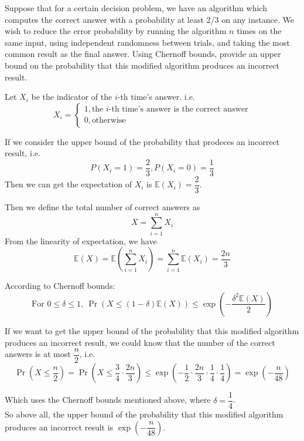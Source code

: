\problem{}
Suppose that for a certain decision problem, we have an algorithm which computes the correct answer with a probability  at least 2/3 on any instance.  We wish to reduce the error probability by running the algorithm $n$ times on the same input, using independent randomness between trials, and taking the most common result as the final answer. Using Chernoff bounds, provide an upper bound on the probability that this modified algorithm produces an incorrect result.

\solution{}

Let $X_i$ be the indicator of the $i$-th time's answer. i.e.
$$X_{i}=\begin{cases}1,\text{the $i$-th time's answer is the correct answer}\\0,\text{otherwise}\end{cases}$$

If we consider the upper bound of the probability that prodeces an incorrect result, i.e.
$$P(X_i=1)=\dfrac{2}{3}, P(X_i=0)=\dfrac{1}{3}$$
Then we can get the expectation of $X_i$ is $\mathbb{E}(X_i)=\dfrac{2}{3}$.

Then we define the total number of correct answers as $$X=\sum_{i=1}^nX_i$$
From the linearity of expectation, we have
$$\mathbb{E}(X)=\mathbb{E}\left(\sum_{i=1}^n{X_i}\right)=\sum_{i=1}^n\mathbb{E}(X_i)=\dfrac{2n}{3}$$

According to Chernoff bounds:
$$\text{For } 0\leq\delta\leq 1,\ \Pr(X\leq(1-\delta)\mathbb{E}(X))\leq \exp\left(-\dfrac{\delta^2\mathbb{E}(X)}{2}\right)$$

If we want to get the upper bound of the probability that this modified algorithm produces an incorrect result, we could know that the number of the correct answers is at most $\dfrac{n}{2}$, i.e.
$$\Pr\left(X\leq\dfrac{n}{2}\right)=\Pr\left(X\leq\dfrac{3}{4}\cdot\dfrac{2n}{3}\right)\leq \exp\left(-\dfrac{1}{2}\cdot\dfrac{2n}{3}\cdot\dfrac{1}{4}\cdot\dfrac{1}{4}\right)=\exp\left(-\dfrac{n}{48}\right)$$

Which uses the Chernoff bounds mentioned above, where $\delta=\dfrac{1}{4}$.\\
So above all, the upper bound of the probability that this modified algorithm produces an incorrect result is $\exp\left(-\dfrac{n}{48}\right)$.

\newpage